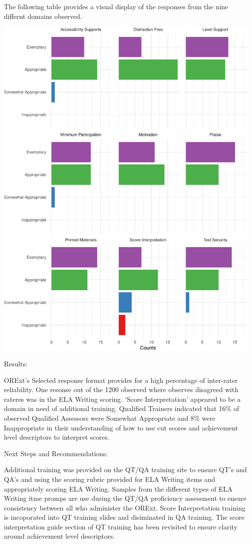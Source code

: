 \documentclass[]{article}
\begin{document}
The following table provides a visual display of the responses from the
nine differnt domains observed.

\includegraphics{Critical_Element_4_files/figure-latex/unnamed-chunk-1-1.pdf}

Results:

ORExt's Selected response format provides for a high percentage of
inter-rater reliability. One resonse out of the 1200 observed where
observes disagreed with rateres was in the ELA Writing scoring. `Score
Interpretation' appeared to be a domain in need of additional training.
Qualified Trainers indicated that 16\% of observed Qualified Assessors
were Somewhat Appropriate and 8\% were Inappropriate in their
understanding of how to use cut scores and achievement level descriptors
to interpret scores.

Next Steps and Recommendations:

Additional training was provided on the QT/QA training site to ensure
QT's and QA's and using the scoring rubric provided for ELA Writing
items and appropriately scoring ELA Writing. Samples from the different
types of ELA Writing itme promps are use during the QT/QA proficiency
assessment to ensure consistency between all who administer the ORExt.
Score Interpretation training is incoporated into QT training slides and
disiminated in QA training. The score interpretation guide section of QT
training has been revisited to ensure clarity around achievement level
descriptors.
\end{document}
